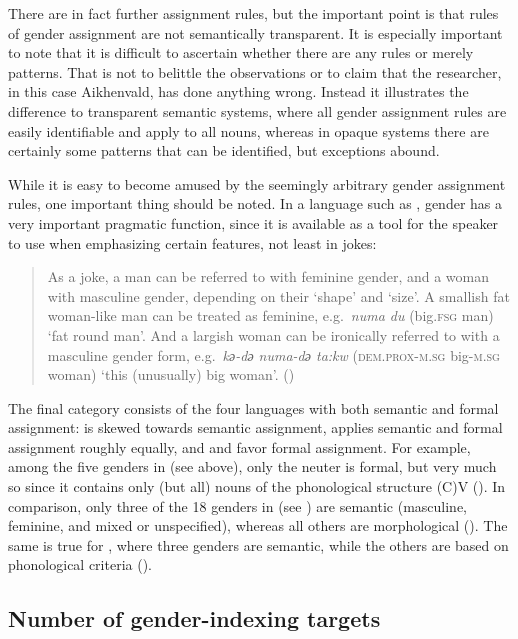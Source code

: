 \documentclass[output=collectionpaper]{langsci/langscibook}
\begin{document}
There are in fact further assignment rules, but the important point is that rules of gender assignment are not semantically transparent. It is especially important to note that it is difficult to ascertain whether there are any rules or merely patterns. That is not to belittle the observations or to claim that the researcher, in this case Aikhenvald, has done anything wrong. Instead it illustrates the difference to transparent semantic systems, where all gender assignment rules are easily identifiable and apply to all nouns, whereas in opaque systems there are certainly some patterns that can be identified, but exceptions abound.

While it is easy to become amused by the seemingly arbitrary gender assignment rules, one important thing should be noted. In a language such as , gender has a very important pragmatic function, since it is available as a tool for the speaker to use when emphasizing certain features, not least in jokes:

\begin{quote}
As a joke, a man can be referred to with feminine gender, and a woman with masculine gender, depending on their `shape' and `size'. A smallish fat woman-like man can be treated as feminine, e.g.\ \textit{numa du} (big.\textsc{fsg} man) `fat round man'. And a largish woman can be ironically referred to with a masculine gender form, e.g.\ \textit{kә-dә numa-dә ta:kw} (\textsc{dem.prox-m.sg} big-\textsc{m.sg} woman) `this (unusually) big woman'. (\citealt[121]{Aikhenvald2008})
\end{quote}

The final category consists of the four languages with both semantic and formal assignment:  is skewed towards semantic assignment,  applies semantic and formal assignment roughly equally, and  and  favor formal assignment. For example, among the five genders in  (see  above), only the neuter is formal, but very much so since it contains only (but all) nouns of the phonological structure (C)V (\citealt{Waelchli2018}). In comparison, only three of the 18 genders in  (see ) are semantic (masculine, feminine, and mixed or unspecified), whereas all others are morphological (\citealt[8]{Conrad1991}). The same is true for , where three genders are semantic, while the others are based on phonological criteria (\citealt[119]{Foley1991}).

\subsection{Number of gender-indexing targets}
\label{sec:Svard:3.4}
\end{document}
